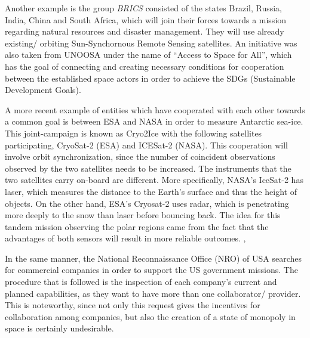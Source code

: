Another example is the group \textit{BRICS} consisted of the states Brazil, Russia, India, China and South Africa, which will join their forces towards a mission regarding natural resources and disaster management. They will use already existing/ orbiting Sun-Synchornous Remote Sensing satellites. \cite{BRICS} An initiative was also taken from UNOOSA under the name of \hspace{1mm} “Access to Space for All”, which has the goal of connecting and creating necessary conditions for cooperation between the established space actors in order to achieve the SDGs (Sustainable Development Goals). \cite{UNOOSA}

A more recent example of entities which have cooperated with each other towards a common goal is between ESA and NASA in order to measure Antarctic sea-ice. This joint-campaign is known as Cryo2Ice with the following satellites participating, CryoSat-2 (ESA) and ICESat-2 (NASA). This cooperation will involve orbit synchronization, since the number of coincident observations observed by the two satellites needs to be increased. The instruments that the two satellites carry on-board are different. More specifically, NASA's IceSat-2 has laser, which measures the distance to the Earth's surface and thus the height of objects. On the other hand, ESA's Cryosat-2 uses radar, which is penetrating more deeply to the snow than laser before bouncing back. The idea for this tandem mission observing the polar regions came from the fact that the advantages of both sensors will result in more reliable outcomes. \cite{Cryo2ice_news}, \cite{Cryo2ice}

In the same manner, the National Reconnaissance Office (NRO) of USA searches for commercial companies in order to support the US government missions. The procedure that is followed is the inspection of each company's current and planned capabilities, as they want to have more than one collaborator/ provider. This is noteworthy, since not only this request gives the incentives for collaboration among companies, but also the creation of a state of monopoly in space is certainly undesirable. \cite{NRO}

